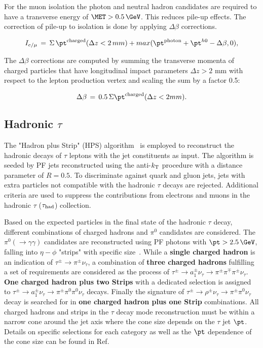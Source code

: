 For the muon isolation the photon and neutral hadron candidates are required to have a transverse energy of $\MET>0.5\,\GeV$. This reduces pile-up effects. The correction of pile-up to isolation is done by applying $\Delta\beta$ corrections.
\begin{linenomath}
\begin{equation}
\label{eq:muonisolation1}
I_{e/ \mu}\,=\,\Sigma\, \pt^{\rm charged }(\Delta z <2\,mm)+max(\pt^{\rm photon}+\pt^{h0 }-\Delta \beta,0),
\end{equation}
\end{linenomath}
The $\Delta\beta$ corrections are computed by summing the transverse momenta of charged particles
that have longitudinal impact parameters $\Delta z > 2$ mm with respect to the lepton production
vertex and scaling the sum by a factor 0.5:
\begin{linenomath}
\begin{equation}
\label{eq:muonisolation2}
\Delta\beta\,=\,0.5\, \Sigma \pt^{\rm charged }(\Delta z <2mm).
\end{equation}
\end{linenomath}

\subsection{\texorpdfstring{Hadronic $\tau$}{Hadronic tau}} 
\label{sec:hadTau}
The "Hadron plus Strip" (HPS) algorithm~\cite{2012JInst...7.1001C} is employed to reconstruct the hadronic decays of $\tau$ leptons with the jet constituents as input. The algorithm is seeded by PF jets reconstructed using the anti-$k_{\rm T}$ procedure with a distance parameter of $R=0.5$. To discriminate against quark and gluon jets, jets with extra particles not compatible with the hadronic $\tau$ decays are rejected. Additional criteria are used to suppress the contributions from electrons and muons in the hadronic $\tau$ ($\tau_{\rm had}$) collection.

Based on the expected particles in the final state of the hadronic $\tau$ decay, different combinations of charged hadrons and $\pi^0$ candidates are considered. The $\pi^0 (\to\gamma\gamma)$ candidates are reconstructed using PF photons with $\pt>2.5\,\GeV$, falling into $\eta-\phi$ "strips" with specific size~\cite{CMS_AN_2013-171}. While a \textbf{single charged hadron} is an indication of $\tau^{\pm}\to\pi^{\pm}\nu_{\tau}$, a combination of \textbf{three charged hadrons} fulfilling a set of requirements are considered as the process of $\tau^{\pm}\to a_1^{\pm}\nu_{\tau}\to\pi^{\pm}\pi^{\mp}\pi^{\pm}\nu_{\tau}$. \textbf{One charged hadron plus two Strips} with a dedicated selection is assigned to $\tau^{\pm}\to a_1^{\pm}\nu_{\tau}\to\pi^{\pm}\pi^{0}\pi^{0}\nu_{\tau}$ decays. Finally the signature of  $\tau^{\pm}\to\rho^{\pm}\nu_{\tau}\to\pi^{\pm}\pi^{0}\nu_{\tau}$ decay is searched for in \textbf{one charged hadron plus one Strip} combinations. All charged hadrons and strips in the $\tau$ decay mode reconstruction must be within a narrow cone around the jet axis where the cone size depends on the $\tau$ jet $\pt$. Details on specific selections for each category as well as the $\pt$ dependence of the cone size can be found in Ref.~\cite{CMS_AN_2013-171}

